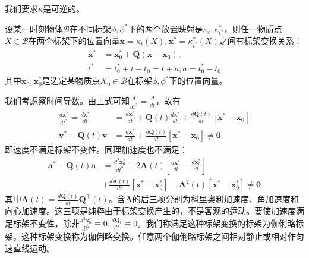 \documentclass[main.tex]{subfiles}
\begin{document}
我们要求$\kappa$是可逆的。

设某一时刻物体$\mathcal{B}$在不同标架$\phi,\phi^*$下的两个放置映射是$\kappa_t,\kappa_{t^*}^*$，则任一物质点$X\in\mathcal{B}$在两个标架下的位置向量$\mathbf{x}=\kappa_t\left(X\right),\mathbf{x}^*=\kappa_{t^*}^*\left(X\right)$之间有标架变换关系：
\begin{align*}
\mathbf{x}^*&=\mathbf{x}_0^*+\mathbf{Q}\left(\mathbf{x}-\mathbf{x}_0\right),\\
t^*&=t_0^*+t-t_0=t+a,a=t_0^*-t_0
\end{align*}
其中$\mathbf{x}_0,\mathbf{x}_0^*$是选定某物质点$X_0\in\mathcal{B}$在标架$\phi,\phi^*$下的位置向量。

我们考虑察时间导数。由上式可知$\frac{d}{dt^*}=\frac{d}{dt}$，故有
\begin{align*}
    \frac{d\mathbf{x}^*}{dt^*}=\frac{d\mathbf{x}^*}{dt}&=\frac{d\mathbf{x}_0^*}{dt}+\mathbf{Q}\left(t\right)\frac{d\mathbf{x}^*}{dt}+\frac{d\mathbf{Q}\left(t\right)}{dt}\left[\mathbf{x}^*-\mathbf{x}_0\right]\\
    \mathbf{v}^*-\mathbf{Q}\left(t\right)\mathbf{v}&=\frac{d\mathbf{x}_0^*}{dt}+\frac{d\mathbf{Q}\left(t\right)}{dt}\left[\mathbf{x}^*-\mathbf{x}_0\right]\neq \mathbf{0}
\end{align*}
即速度不满足标架不变性。同理加速度也不满足：
\begin{align*}
\mathbf{a}^*-\mathbf{Q}\left(t\right)\mathbf{a}&=\frac{d^2\mathbf{x}_0^*}{dt^2}+2\mathbf{A}\left(t\right)\left[\frac{d\mathbf{x}^*}{dt}-\frac{d\mathbf{x}_0^*}{dt}\right]\\
&+\frac{d\mathbf{A}\left(t\right)}{dt}\left[\mathbf{x}^*-\mathbf{x}_0^*\right]-\mathbf{A}^2\left(t\right)\left[\mathbf{x}^*-\mathbf{x}_0^*\right]\neq \mathbf{0}
\end{align*}
其中$\mathbf{A}\left(t\right)=\frac{d\mathbf{Q}\left(t\right)}{dt}\mathbf{Q}^\intercal\left(t\right)$。含$\mathbf{A}$的后三项分别为科里奥利加速度、角加速度和向心加速度。这三项是纯粹由于标架变换产生的，不是客观的运动。要使加速度满足标架不变性，除非$\frac{d^2\mathbf{x}_0^*}{dt^2}\equiv 0,\frac{d\mathbf{Q}_t}{dt}\equiv 0$。我们称满足这种标架变换的标架为伽俐略标架，这种标架变换称为伽俐略变换。任意两个伽俐略标架之间相对静止或相对作匀速直线运动。
\end{document}
